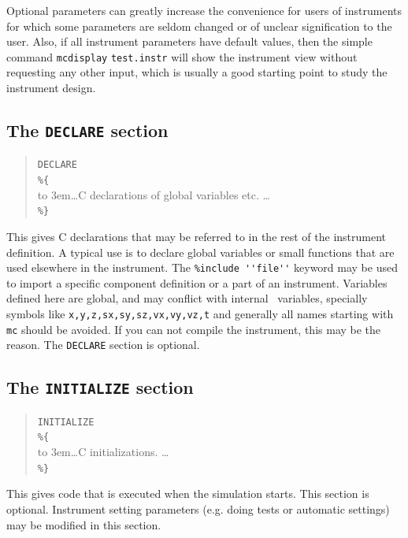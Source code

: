 Optional parameters can greatly increase the convenience for users of
instruments for which some parameters are seldom changed or of unclear signification to the user. Also, if all instrument parameters have default values, then the simple command \verb+mcdisplay+ \verb+test.instr+ will show the instrument view without requesting any other input, which is usually a good starting point to study the instrument design.

\subsection{The \texttt{DECLARE} section}
\label{s:declare}

\begin{quote}
  \texttt{DECLARE} \\
  \verb|%{| \\
  \hbox to 3em{}\ldots C declarations of global variables etc. \ldots \\
  \verb|%}|
\end{quote} 
This gives C declarations that may be referred to in the rest of the
instrument definition. A typical use is to declare global variables or
small functions that are used elsewhere in the instrument. The \verb+%include ''file''+ keyword may be used to import a specific
component definition or a part of an instrument. Variables defined here are global, and may conflict with internal \MCS\ variables, specially symbols like \verb+x,y,z,sx,sy,sz,vx,vy,vz,t+ and generally all names starting with \verb+mc+ should be avoided. If you can not compile the instrument, this may be the reason. The \texttt{DECLARE} section is optional.

\subsection{The \texttt{INITIALIZE} section}
\label{s:initialize}

\begin{quote}
  \texttt{INITIALIZE} \\
  \verb|%{| \\
  \hbox to 3em{}\ldots C initializations. \ldots \\
  \verb|%}|
\end{quote} 
This gives code that is executed when the simulation starts. This section is
optional. Instrument setting parameters (e.g. doing tests or automatic settings) may be modified in this section.


